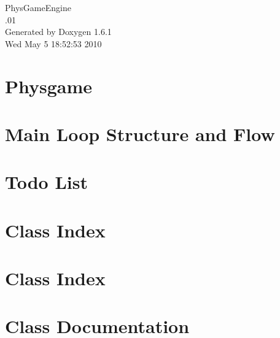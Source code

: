 \documentclass[a4paper]{book}
\begin{document}
\hypersetup{pageanchor=false}
\begin{titlepage}
\vspace*{7cm}
\begin{center}
{\Large PhysGameEngine \\[1ex]\large .01 }\\
\vspace*{1cm}
{\large Generated by Doxygen 1.6.1}\\
\vspace*{0.5cm}
{\small Wed May 5 18:52:53 2010}\\
\end{center}
\end{titlepage}
\clearemptydoublepage
{}
\tableofcontents
\clearemptydoublepage
{}
\hypersetup{pageanchor=true}
\chapter{Physgame}
\label{index}\hypertarget{index}{}
\chapter{Main Loop Structure and Flow}
\label{mainloop1}
\hypertarget{mainloop1}{}

\chapter{Todo List}
\label{todo}
\hypertarget{todo}{}

\chapter{Class Index}

\chapter{Class Index}

\chapter{Class Documentation}















\printindex
\end{document}
